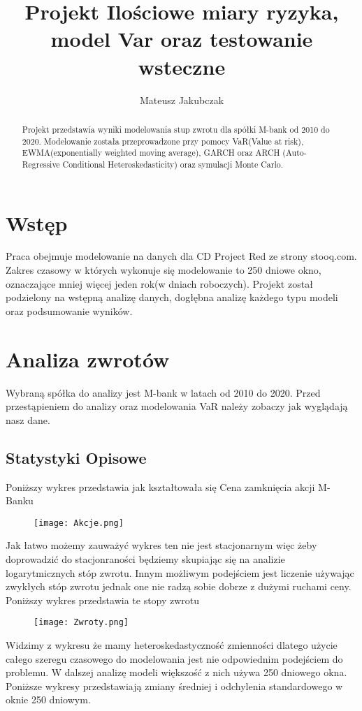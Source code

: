 \documentclass[]{article}
\title{Projekt Ilościowe miary ryzyka, model Var oraz testowanie wsteczne }
\author{Mateusz Jakubczak}
\begin{document}
\maketitle

\begin{abstract}
	
	Projekt przedstawia wyniki modelowania stup zwrotu dla spółki M-bank od 2010 do 2020. Modelowanie została przeprowadzone przy pomocy VaR(Value at risk), EWMA(exponentially weighted moving average), GARCH oraz ARCH (Auto-Regressive Conditional Heteroskedasticity) oraz symulacji Monte Carlo.
	
\end{abstract}


\newpage

\tableofcontents{}


\newpage


\section{Wstęp}
Praca obejmuje modelowanie na danych dla CD Project Red ze strony stooq.com. 
Zakres czasowy w których wykonuje się modelowanie to 250 dniowe okno,  oznaczające mniej więcej jeden rok(w dniach roboczych). Projekt został podzielony na wstępną analizę danych, dogłębna analizę każdego typu modeli  oraz podsumowanie wyników. 

\section{Analiza zwrotów}
	Wybraną spółka do analizy jest M-bank w latach od 2010 do 2020. 
	Przed przestąpieniem do analizy oraz modelowania VaR należy zobaczy jak wyglądają nasz dane. 
	\subsection{Statystyki Opisowe}
	Poniższy wykres przedstawia jak kształtowała się Cena zamknięcia akcji M-Banku 
	\begin{figure}[h!]
		\centering
		\texttt{[image: Akcje.png]}
		\caption{}
		\label{fig:akcje}
	\end{figure}
	\newpage
	Jak łatwo możemy zauważyć wykres ten nie jest stacjonarnym więc żeby doprowadzić do stacjonraności będziemy skupiając się na analizie logarytmicznych stóp zwrotu. Innym możliwym podejściem jest liczenie używając zwykłych stóp zwrotu jednak one nie radzą sobie dobrze z dużymi  ruchami ceny. Poniższy wykres przedstawia te stopy zwrotu \begin{figure}[h!]
		\centering
		\texttt{[image: Zwroty.png]}
		\caption{}
		\label{fig:zwroty}
	\end{figure}
	Widzimy z wykresu że mamy heteroskedastyczność zmienności dlatego użycie całego szeregu czasowego do modelowania jest nie odpowiednim podejściem do problemu. 
	W dalszej analizę modeli większość z nich używa 250 dniowego okna. Poniższe wykresy przedstawiają zmiany średniej i odchylenia standardowego w oknie 250 dniowym. 
	
\end{document}
